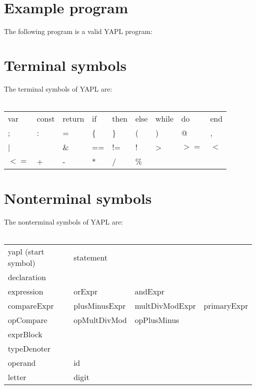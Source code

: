 \setlength{\grammarparsep}{10pt plus 1pt minus 1pt} %
\setlength{\grammarindent}{12em} %
\section{Example program}
The following program is a valid YAPL program:


\section{Terminal symbols}
The terminal symbols of YAPL are:\\\\
\begin{tabular}{lllllllll}
var		&	const	&	return	&	if	&	then	&	else	&	while	&	do		&	end 	\\
;		&	: 		& 	= 		& 	\{ 	& 	\} 		& 	( 		& 	) 		& 	@ 		& 	, 		\\ 
| 		& 	\		&	\& 		& 	== 	& 	!= 		& 	! 		& 	> 		& 	$>=$	& 	$<$ 	\\
$<=$	&	+ 		& 	- 		& 	* 	& 	/ 		& 	\% 	\\
\end{tabular}

\section{Nonterminal symbols}
The nonterminal symbols of YAPL are:\\\\
\begin{tabular}{llll}
yapl	 (start symbol)		&	statement		&					&				\\
declaration					&					&					&				\\
expression					&	orExpr			&	andExpr			&				\\
compareExpr					&	plusMinusExpr	&	multDivModExpr	&	primaryExpr	\\
opCompare					&	opMultDivMod	&	opPlusMinus		&				\\
exprBlock					&					&					&				\\
typeDenoter					&					&					&				\\
operand						&	id				&					&				\\
letter						&	digit			&					&				\\
\end{tabular}


